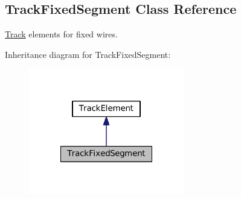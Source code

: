 \hypertarget{classKite_1_1TrackFixedSegment}{}\subsection{Track\+Fixed\+Segment Class Reference}
\label{classKite_1_1TrackFixedSegment}


\mbox{\hyperlink{classKite_1_1Track}{Track}} elements for fixed wires.  




Inheritance diagram for Track\+Fixed\+Segment\+:\nopagebreak
\begin{figure}[H]
\begin{center}
\leavevmode
\includegraphics[width=192pt]{classKite_1_1TrackFixedSegment__inherit__graph}
\end{center}
\end{figure}
